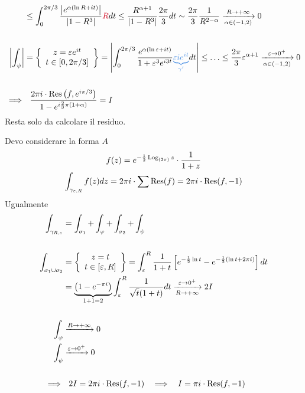 \begin{equation*}
\begin{aligned}
 & \leq \int^{2\pi /3}_{0}\frac{\left| e^{\alpha (\ln R + it)}\right|}{\left| 1 - R^{3}\right|}\textcolor[rgb]{0.82, 0.01, 0.11}{R} dt \leq \frac{R^{\alpha + 1}}{\left| 1 - R^{3}\right|}\frac{2\pi}{3} dt\sim \frac{2\pi}{3}\frac{1}{R^{2 - \alpha}}\xrightarrow[\alpha \in (- 1, 2)]{R\rightarrow + \infty} 0\\
 & \\
\left| \int_{\psi}\right| & = \left\{
\begin{array}{c}
z = \varepsilon e^{it}\\
t\in [ 0, 2\pi /3]
\end{array}\right\} = \left| \int^{2\pi /3}_{0}\frac{e^{\alpha (\ln \varepsilon + it)}}{1 + \varepsilon^{3} e^{i3t}}\textcolor[rgb]{0.29, 0.56, 0.89}{\underbrace{\varepsilon ie^{it}}_{\gamma '}} dt\right| \leq \dotsc \leq \frac{2\pi}{3} \varepsilon^{\alpha + 1}\xrightarrow[\alpha \in (- 1, 2)]{\varepsilon \rightarrow 0^{+}} 0\\
 & \\
\implies & \ \ \frac{2\pi i \cdot \Res \left(f, e^{i\pi /3}\right)}{1 - e^{i\frac{2}{3} \pi (1 + \alpha)}} = I
\end{aligned}
\end{equation*}
Resta solo da calcolare il residuo.
\Soluzione

Devo considerare la forma $A$
\begin{gather*}
f(z) = e^{- \frac{1}{2}\operatorname{Log}_{(2\pi)} z} \cdot \frac{1}{1 + z}\\
\int_{\gamma_{\varepsilon, R}} f(z) dz = 2\pi i \cdot \sum \operatorname{Res} (f) = 2\pi i \cdot \operatorname{Res} (f, - 1)
\end{gather*}
Ugualmente
\begin{equation*}
\begin{aligned}
\int_{\gamma_{R, \varepsilon}} & = \int_{\sigma_{1}} + \int_{\varphi} + \int_{\sigma_{2}} + \int_{\psi}\\
 & \\
\int_{\sigma_{1} \cup \sigma_{2}} & = \left\{
\begin{array}{c}
z = t\\
t\in [ \varepsilon, R]
\end{array}\right\} = \int^{R}_{\varepsilon}\frac{1}{1 + t}\left[ e^{- \frac{1}{2}\ln t} - e^{- \frac{1}{2}(\ln t + 2\pi i)}\right] dt\\
 & = \underbrace{\left(1 - e^{- \pi i}\right)}_{1 + 1 = 2}\int^{R}_{\varepsilon}\frac{1}{\sqrt{t}(1 + t)} dt\xrightarrow[R\rightarrow + \infty ]{\varepsilon \rightarrow 0^{+}} 2I\\
 & \\
\int_{\varphi} & \xrightarrow{R\rightarrow + \infty} 0\\
\int_{\psi} & \xrightarrow{\varepsilon \rightarrow 0^{+}} 0\\
 & \\
\implies & \ \ 2I = 2\pi i \cdot \operatorname{Res} (f, - 1) \ \ \implies \ \ I = \pi i \cdot \operatorname{Res} (f, - 1)
\end{aligned}
\end{equation*}
\Soluzione

